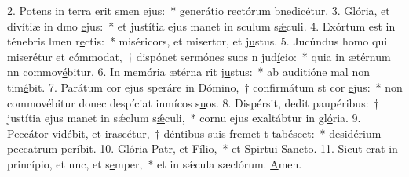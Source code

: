 2. Potens in terra erit smen \uline{e}jus:~* generátio rectórum bnedic\uline{é}tur.
3. Glória, et divítiæ in dmo \uline{e}jus:~* et justítia ejus manet in sculum s\uline{ǽ}culi.
4. Exórtum est in ténebris lmen r\uline{e}ctis:~* miséricors, et misertor, et j\uline{u}stus.
5. Jucúndus homo qui miserétur et cómmodat,~† dispónet sermónes suos n jud\uline{í}cio:~* quia in ætérnum nn commov\uline{é}bitur.
6. In memória ætérna rit j\uline{u}stus:~* ab auditióne mal non tim\uline{é}bit.
7. Parátum cor ejus speráre in Dómino,~† confirmátum st cor \uline{e}jus:~* non commovébitur donec despíciat inmícos s\uline{u}os.
8. Dispérsit, dedit paupéribus:~† justítia ejus manet in sǽclum s\uline{ǽ}culi,~* cornu ejus exaltábtur in gl\uline{ó}ria.
9. Peccátor vidébit, et irascétur,~† déntibus suis fremet t tab\uline{é}scet:~* desidérium peccatrum per\uline{í}bit.
10. Glória Patr, et F\uline{í}lio,~* et Spirtui S\uline{a}ncto.
11. Sicut erat in princípio, et nnc, et s\uline{e}mper,~* et in sǽcula sæclórum. \uline{A}men.
